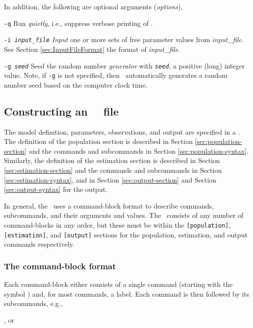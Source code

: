 In addition, the following are optional arguments (\emph{options}),

\begin{description}

\item \texttt{-q} Run \emph{quietly}, i.e., suppress verbose printing of \SPM.

\item \texttt{-i \emph{input\_file}} \emph{Input} one or more sets of free parameter values from \emph{input\_file}. See Section \ref{sec:InputFileFormat} the format of \emph{input\_file}.

\item \texttt{-g \emph{seed}} Seed the random number \emph{generator} with \texttt{\emph{seed}}, a positive (long) integer value. Note, if \texttt{-g} is not specified, then \SPM\ automatically generates a random number seed based on the computer clock time. 

\end{description}

\subsection{Constructing an \SPM\ \config\ file\label{constructing-spm-config"}}

The model definition, parameters, observations, and output are specified in a \config. The definition of the population section is described in Section \ref{sec:population-section} and the commands and subcommands in Section \ref{sec:population-syntax}. Similarly, the definition of the estimation section is described in Section \ref{sec:estimation-section} and the commands and subcommands in Section \ref{sec:estimation-syntax}, and in Section \ref{sec:output-section} and Section \ref{sec:output-syntax} for the output. 

In general, the \config\ uses a command-block format to describe commands, subcommands, and their arguments and values. The \config\ consists of any number of command-blocks in any order, but these must be within the \texttt{[population]}, \texttt{[estimation]}, and  \texttt{[output]} sections for the population, estimation, and output commands respectively. 

\subsubsection{The command-block format}

Each command-block either consists of a single command (starting with the symbol \@) and, for most commands, a label. Each command is then followed by its subcommands, e.g., 
\begin{description}
\item {}, or 
\item {}
\end{description}


